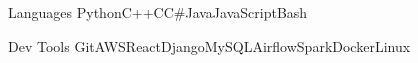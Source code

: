 \begin{siderules}


\begin{cvskills}


\cvskill
{Languages} %
{Python{\enskip\cdotp\enskip}C++{\enskip\cdotp\enskip}C{\enskip\cdotp\enskip}C\#{\enskip\cdotp\enskip}Java{\enskip\cdotp\enskip}JavaScript{\enskip\cdotp\enskip}Bash} %


\cvskill
{Dev Tools} 
{Git{\enskip\cdotp\enskip}AWS{\enskip\cdotp\enskip}React{\enskip\cdotp\enskip}Django{\enskip\cdotp\enskip}MySQL{\enskip\cdotp\enskip}Airflow{\enskip\cdotp\enskip}Spark{\enskip\cdotp\enskip}Docker{\enskip\cdotp\enskip}Linux} 





\end{cvskills}
\end{siderules}